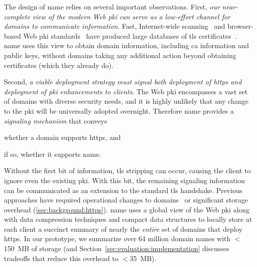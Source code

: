The design of \ac{name} relies on several important observations. First,
\emph{our near-complete view of the modern Web \ac{pki} can serve as a low-effort channel
for domains to communicate information}. Fast, Internet-wide
scanning~\cite{durumeric2013zmap} and browser-based Web \ac{pki}
standards~\cite{sleevi2016requiring} have produced large databases of
\ac{tls} certificates~\cite{durumeric2015search}. 
\ac{name} uses this view to obtain domain information, including \ac{ca}
information and public keys, without domains taking any additional action
beyond obtaining certificates (which they already do). 

Second, \emph{a viable deployment strategy must signal both deployment of
\ac{https} and deployment of \ac{pki} enhancements to clients}. The Web \ac{pki}
encompasses a vast set of domains with diverse security needs, and it is highly
unlikely that any change to the \ac{pki} will be universally adopted overnight.
Therefore \ac{name} provides a \emph{signaling mechanism} that conveys
\begin{inparaenum}
\item whether a domain supports \ac{https}, and
\item if so, whether it supports \ac{name}.
\end{inparaenum}
Without the first bit of information, \ac{tls} stripping can occur, causing the
client to ignore even the existing \ac{pki}. With this bit, the remaining
signaling information can be communicated as an extension to the standard
\ac{tls} handshake. Previous approaches have required operational changes to
domains~\cite{rfc4033, rfc6698} or significant storage overhead
(\autoref{sec:background:https}). \ac{name} uses a global view of the Web
\ac{pki} along with data compression techniques and compact data
structures to locally store at each client a succinct summary of nearly the
\emph{entire} set of domains that deploy \ac{https}. In our prototype, we
summarize over 64 million domain names with $<$150~MB of storage (and
Section~\ref{sec:evaluation:implementation} discusses tradeoffs that
reduce this overhead to $<$35~MB).

